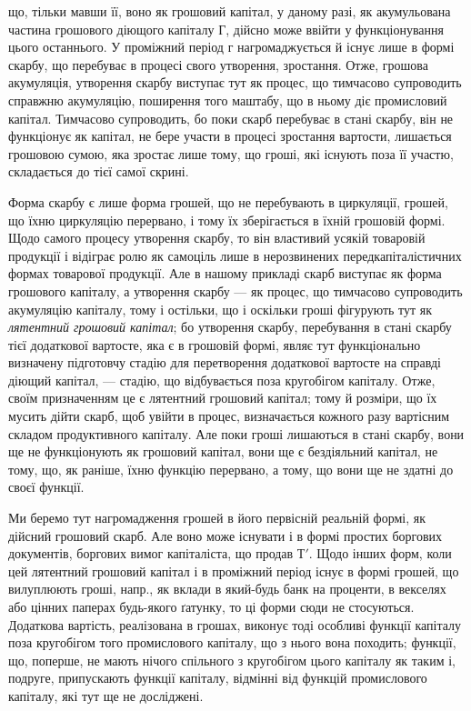 що, тільки мавши її, воно як грошовий капітал, у даному разі, як акумульована
частина грошового діющого капіталу $Г$, дійсно може ввійти у функціонування
цього останнього. У проміжний період г нагромаджується й
існує лише в формі скарбу, що перебуває в процесі свого утворення, зростання.
Отже, грошова акумуляція, утворення скарбу виступає тут як процес,
що тимчасово супроводить справжню акумуляцію, поширення того маштабу,
що в ньому діє промисловий капітал. Тимчасово супроводить, бо
поки скарб перебуває в стані скарбу, він не функціонує як капітал, не
бере участи в процесі зростання вартости, лишається грошовою сумою,
яка зростає лише тому, що гроші, які існують поза її участю, складається
до тієї самої скрині.

Форма скарбу є лише форма грошей, що не перебувають в циркуляції,
грошей, що їхню циркуляцію перервано, і тому їх зберігається
в їхній грошовій формі. Щодо самого процесу утворення скарбу, то
він властивий усякій товаровій продукції і відіграє ролю як самоціль
лише в нерозвинених передкапіталістичних формах товарової продукції.
Але в нашому прикладі скарб виступає як форма грошового капіталу, а
утворення скарбу — як процес, що тимчасово супроводить акумуляцію
капіталу, тому і остільки, що і оскільки гроші фігурують тут як
\emph{лятентний грошовий капітал}; бо утворення скарбу, перебування в стані
скарбу тієї додаткової вартосте, яка є в грошовій формі, являє тут функціонально
визначену підготовчу стадію для перетворення додаткової
вартосте на справді діющий капітал, — стадію, що відбувається поза
кругобігом капіталу. Отже, своїм призначенням це є лятентний грошовий
капітал; тому й розміри, що їх мусить дійти скарб, щоб увійти в
процес, визначається кожного разу вартісним складом продуктивного
капіталу. Але поки гроші лишаються в стані скарбу, вони ще не функціонують
як грошовий капітал, вони ще є бездіяльний капітал, не тому,
що, як раніше, їхню функцію перервано, а тому, що вони ще не здатні
до своєї функції.

Ми беремо тут нагромадження грошей в його первісній реальній
формі, як дійсний грошовий скарб. Але воно може існувати і в
формі простих боргових документів, боргових вимог капіталіста,
що продав $Т'$. Щодо інших форм, коли цей лятентний грошовий
капітал і в проміжний період існує в формі грошей, що вилуплюють
гроші, напр., як вклади в який-будь банк на проценти, в векселях
або цінних паперах будь-якого ґатунку, то ці форми сюди не стосуються.
Додаткова вартість, реалізована в грошах, виконує тоді особливі функції
капіталу поза кругобігом того промислового капіталу, що з нього
вона походить; функції, що, поперше, не мають нічого спільного з кругобігом
цього капіталу як таким і, подруге, припускають функції капіталу,
відмінні від функцій промислового капіталу, які тут ще не досліджені.

